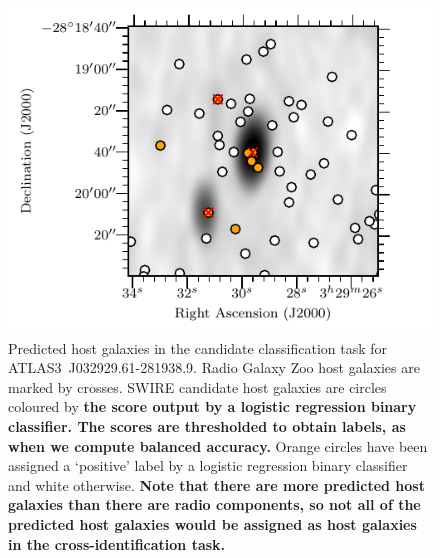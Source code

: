\documentclass[fleqn,usenatbib,usedcolumn]{mnras}
\newcommand{\edited}[1]{{\bf {#1}}}
\begin{document}
    \begin{figure}
      \centering
      \includegraphics[width=\columnwidth]{images/positives.pdf}
      \caption{Predicted host galaxies in the candidate classification task for ATLAS3~J032929.61-281938.9. Radio Galaxy Zoo host galaxies
      are marked by crosses. SWIRE candidate host galaxies are circles coloured by \edited{the score output by a logistic regression binary classifier. The scores are thresholded to obtain labels, as when we compute balanced accuracy.} Orange circles have been assigned a `positive' label by a logistic regression binary classifier and white otherwise. \edited{Note that there are more predicted host galaxies than there are radio components, so not all of the predicted host galaxies would be assigned as host galaxies in the cross-identification task.}
      \label{fig:positives}}
    \end{figure}
\end{document}
